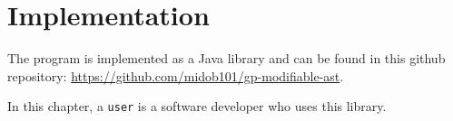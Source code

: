 \section{Implementation}

The program is implemented as a Java library and can be found in this github repository: \url{https://github.com/midob101/gp-modifiable-ast}.

In this chapter, a \verb|user| is a software developer who uses this library.









